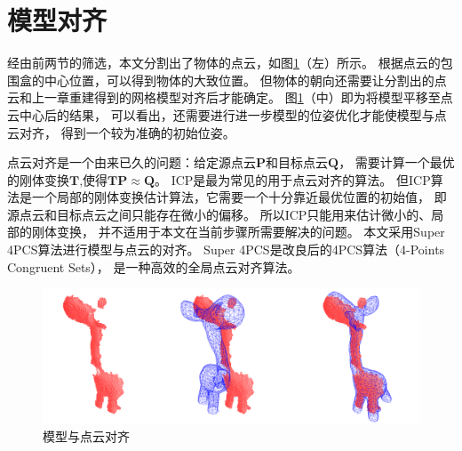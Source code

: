 \section{模型对齐}

经由前两节的筛选，本文分割出了物体的点云，如图\ref{rigid_fit}（左）所示。
根据点云的包围盒的中心位置，可以得到物体的大致位置。
但物体的朝向还需要让分割出的点云和上一章重建得到的网格模型对齐后才能确定。
图\ref{rigid_fit}（中）即为将模型平移至点云中心后的结果，
可以看出，还需要进行进一步模型的位姿优化才能使模型与点云对齐，
得到一个较为准确的初始位姿。

点云对齐是一个由来已久的问题：给定源点云$\bm{P}$和目标点云$\bm{Q}$，
需要计算一个最优的刚体变换$\bm{T}$,使得$\bm{TP} \approx \bm{Q}$。
ICP是最为常见的用于点云对齐的算法。
但ICP算法是一个局部的刚体变换估计算法，它需要一个十分靠近最优位置的初始值，
即源点云和目标点云之间只能存在微小的偏移。
所以ICP只能用来估计微小的、局部的刚体变换，
并不适用于本文在当前步骤所需要解决的问题。
本文采用Super 4PCS算法\cite{mellado2014super}进行模型与点云的对齐。
Super 4PCS是改良后的4PCS算法（4-Points Congruent Sets）\cite{aiger20084}，
是一种高效的全局点云对齐算法。
\begin{figure}
    \centering
    \includegraphics[width = \textwidth]{./Pictures/rigidfitting.png}
    \caption{模型与点云对齐}
    \label{rigid_fit}
\end{figure}

